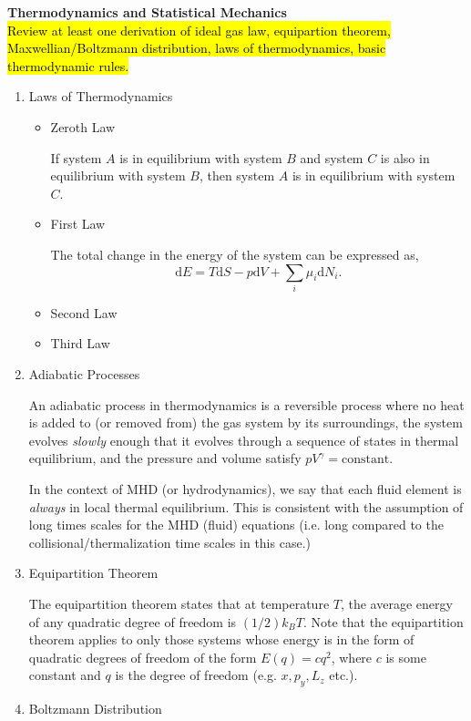 		\item{\bf Thermodynamics and Statistical Mechanics}\\
		\hl{Review at least one derivation of ideal gas law, equipartion theorem, Maxwellian/Boltzmann distribution, laws of thermodynamics, basic thermodynamic rules.}
		\begin{enumerate}
			\item{Laws of Thermodynamics}
			\begin{itemize}
				\item{Zeroth Law}
				\par If system $A$ is in equilibrium with system $B$ and system $C$ is also in equilibrium with system $B$, then system $A$ is in equilibrium with system $C$.
				\item{First Law}
				\par The total change in the energy of the system can be expressed as,
				\begin{equation}
					\mathrm{d}E = T\mathrm{d}S - p\mathrm{d}V + \sum_i\mu_i\mathrm{d}N_i.
				\end{equation}
				\item{Second Law}
				\item{Third Law}
			\end{itemize}
			\item{Adiabatic Processes}
			\par An adiabatic process in thermodynamics is a reversible process where no heat is added to (or removed from) the gas system by its surroundings, the system evolves \textit{slowly} enough that it evolves through a sequence of states in thermal equilibrium, and the pressure and volume satisfy $pV^{\gamma}=\text{constant}$. 
			\par In the context of MHD (or hydrodynamics), we say that each fluid element is \textit{always} in local thermal equilibrium. This is consistent with the assumption of long times scales for the MHD (fluid) equations (i.e. long compared to the collisional/thermalization time scales in this case.)
			\item{Equipartition Theorem}
			\par The equipartition theorem states that at temperature $T$, the average energy of any quadratic degree of freedom is $(1/2)k_BT$. Note that the equipartition theorem applies to only those systems whose energy is in the form of quadratic degrees of freedom of the form $E(q) = cq^2$, where $c$ is some constant and $q$ is the degree of freedom (e.g. $x,p_y,L_z$ etc.).
			\item{Boltzmann Distribution}

\end{enumerate}
